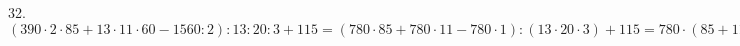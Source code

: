 32. $(390\cdot2\cdot85+13\cdot11\cdot60-1560:2):13:20:3+115=(780\cdot85+780\cdot11-780\cdot1):(13\cdot20\cdot3)+115=780\cdot(85+11-1):780+115=95+115=210.$\\
